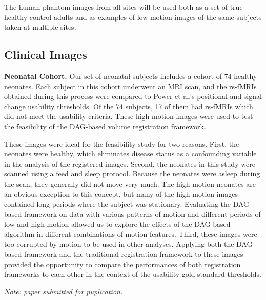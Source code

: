 The human phantom images from all sites will be used both as a set of true healthy control adults and as examples of low motion images of the same subjects taken at multiple sites.

\subsection{Clinical Images}

\textbf{Neonatal Cohort.} Our set of neonatal subjects includes a cohort of 74 healthy neonates. Each subject in this cohort underwent an MRI scan, and the rs-fMRIs obtained during this process were compared to Power et al.'s positional and signal change usability thresholds. Of the 74 subjects, 17 of them had rs-fMRIs which did not meet the usability criteria. These high motion images were used to test the feasibility of the DAG-based volume registration framework. 

These images were ideal for the feasibility study for two reasons. First, the neonates were healthy, which eliminates disease status as a confounding variable in the analysis of the registered images. Second, the neonates in this study were scanned using a feed and sleep protocol. Because the neonates were asleep during the scan, they generally did not move very much. The high-motion neonates are an obvious exception to this concept, but many of the high-motion images contained long periods where the subject was stationary. Evaluating the DAG-based framework on data with various patterns of motion and different periods of low and high motion allowed us to explore the effects of the DAG-based algorithm in different combinations of motion features. Third, these images were too corrupted by motion to be used in other analyses. Applying both the DAG-based framework and the traditional registration framework to these images provided the opportunity to compare the performances of both registration frameworks to each other in the context of the usability gold standard thresholds. 

\textit{Note: paper submitted for puplication.}


